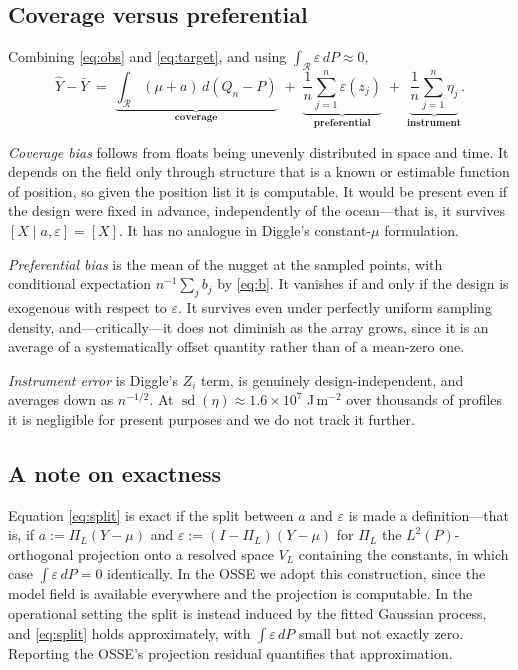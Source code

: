 \documentclass[11pt]{article}
\begin{document}
\subsection{Coverage versus preferential}
\label{sec:coverage-pref}

Combining \eqref{eq:obs} and \eqref{eq:target}, and using
$\int_{\mathcal{R}} \varepsilon \, dP \approx 0$,
\begin{equation}
  \label{eq:split}
  \hat{Y} - \bar{Y}
  \;=\; \underbrace{\int_{\mathcal{R}} (\mu + a)\, d(Q_n - P)}_{\textbf{coverage}}
  \;+\; \underbrace{\frac{1}{n}\sum_{j=1}^{n} \varepsilon(z_j)}_{\textbf{preferential}}
  \;+\; \underbrace{\frac{1}{n}\sum_{j=1}^{n} \eta_j}_{\textbf{instrument}} .
\end{equation}

\emph{Coverage bias} follows from floats being unevenly distributed in space and time. It
depends on the field only through structure that is a known or estimable function of position,
so given the position list it is computable. It would be present even if the design were fixed
in advance, independently of the ocean---that is, it survives $[X \mid a,\varepsilon] = [X]$.
It has no analogue in Diggle's constant-$\mu$ formulation.

\emph{Preferential bias} is the mean of the nugget at the sampled points, with conditional
expectation $n^{-1}\sum_j b_j$ by \eqref{eq:b}. It vanishes if and only if the design is
exogenous with respect to $\varepsilon$. It survives even under perfectly uniform sampling
density, and---critically---it does not diminish as the array grows, since it is an average of
a systematically offset quantity rather than of a mean-zero one.

\emph{Instrument error} is Diggle's $Z_i$ term, is genuinely design-independent, and averages
down as $n^{-1/2}$. At $\operatorname{sd}(\eta) \approx 1.6\times10^{7}$ J\,m$^{-2}$ over
thousands of profiles it is negligible for present purposes and we do not track it further.
\subsection{A note on exactness}
\label{sec:exactness}

Equation \eqref{eq:split} is exact if the split between $a$ and $\varepsilon$ is made a
definition---that is, if $a := \Pi_L(Y - \mu)$ and $\varepsilon := (I - \Pi_L)(Y - \mu)$ for
$\Pi_L$ the $L^2(P)$-orthogonal projection onto a resolved space $V_L$ containing the
constants, in which case $\int \varepsilon \, dP = 0$ identically. In the OSSE we adopt this
construction, since the model field is available everywhere and the projection is computable.
In the operational setting the split is instead induced by the fitted Gaussian process, and
\eqref{eq:split} holds approximately, with $\int \varepsilon \, dP$ small but not exactly zero.
Reporting the OSSE's projection residual quantifies that approximation.
\end{document}
